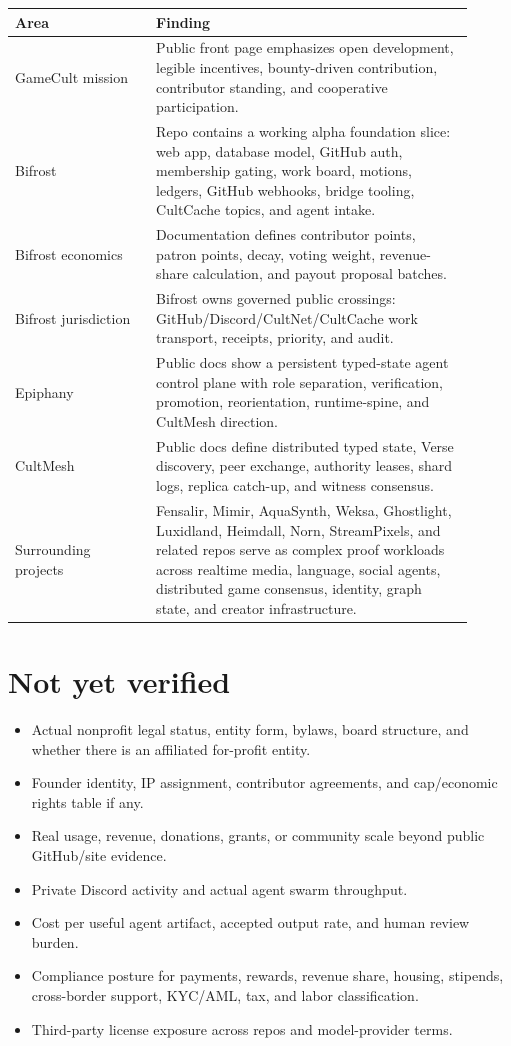 \documentclass[11pt,oneside]{report}
\begin{document}
\begin{longtable}{P{0.28\linewidth}P{0.63\linewidth}}
\toprule
\textbf{Area} & \textbf{Finding} \\
\midrule
GameCult mission & Public front page emphasizes open development, legible incentives, bounty-driven contribution, contributor standing, and cooperative participation. \\
Bifrost & Repo contains a working alpha foundation slice: web app, database model, GitHub auth, membership gating, work board, motions, ledgers, GitHub webhooks, bridge tooling, CultCache topics, and agent intake. \\
Bifrost economics & Documentation defines contributor points, patron points, decay, voting weight, revenue-share calculation, and payout proposal batches. \\
Bifrost jurisdiction & Bifrost owns governed public crossings: GitHub/Discord/CultNet/CultCache work transport, receipts, priority, and audit. \\
Epiphany & Public docs show a persistent typed-state agent control plane with role separation, verification, promotion, reorientation, runtime-spine, and CultMesh direction. \\
CultMesh & Public docs define distributed typed state, Verse discovery, peer exchange, authority leases, shard logs, replica catch-up, and witness consensus. \\
Surrounding projects & Fensalir, Mimir, AquaSynth, Weksa, Ghostlight, Luxidland, Heimdall, Norn, StreamPixels, and related repos serve as complex proof workloads across realtime media, language, social agents, distributed game consensus, identity, graph state, and creator infrastructure. \\
\bottomrule
\end{longtable}

\section{Not yet verified}

\begin{itemize}
  \item Actual nonprofit legal status, entity form, bylaws, board structure, and whether there is an affiliated for-profit entity.
  \item Founder identity, IP assignment, contributor agreements, and cap/economic rights table if any.
  \item Real usage, revenue, donations, grants, or community scale beyond public GitHub/site evidence.
  \item Private Discord activity and actual agent swarm throughput.
  \item Cost per useful agent artifact, accepted output rate, and human review burden.
  \item Compliance posture for payments, rewards, revenue share, housing, stipends, cross-border support, KYC/AML, tax, and labor classification.
  \item Third-party license exposure across repos and model-provider terms.
\end{itemize}
\end{document}

